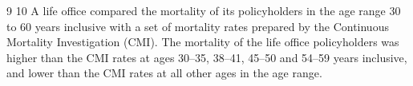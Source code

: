 \documentclass[a4paper,12pt]{article}
\begin{document}
\begin{enumerate}

9
10
A life office compared the mortality of its policyholders in the age range 30 to 60 years inclusive with a set of mortality rates prepared by the Continuous Mortality Investigation (CMI). The mortality of the life office policyholders was higher than
the CMI rates at ages 30–35, 38–41, 45–50 and 54–59 years inclusive, and lower than the CMI rates at all other ages in the age range.
\end{enumerate}
\end{document}
